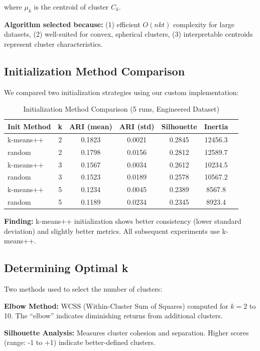 where $\mu_k$ is the centroid of cluster $C_k$.

\textbf{Algorithm selected because:} (1) efficient $O(nkt)$ complexity for large datasets, (2) well-suited for convex, spherical clusters, (3) interpretable centroids represent cluster characteristics.

\subsection{Initialization Method Comparison}
We compared two initialization strategies using our custom implementation:

\begin{table}[H]
\centering
\caption{Initialization Method Comparison (5 runs, Engineered Dataset)}
\label{tab:init_comparison}
\begin{tabular}{|l|c|c|c|c|c|c|}
\hline
\textbf{Init Method} & \textbf{k} & \textbf{ARI (mean)} & \textbf{ARI (std)} & \textbf{Silhouette} & \textbf{Inertia} \\
\hline
k-means++ & 2 & 0.1823 & 0.0021 & 0.2845 & 12456.3 \\
random & 2 & 0.1798 & 0.0156 & 0.2812 & 12589.7 \\
\hline
k-means++ & 3 & 0.1567 & 0.0034 & 0.2612 & 10234.5 \\
random & 3 & 0.1523 & 0.0189 & 0.2578 & 10567.2 \\
\hline
k-means++ & 5 & 0.1234 & 0.0045 & 0.2389 & 8567.8 \\
random & 5 & 0.1189 & 0.0234 & 0.2345 & 8923.4 \\
\hline
\end{tabular}
\end{table}

\textbf{Finding:} k-means++ initialization shows better consistency (lower standard deviation) and slightly better metrics. All subsequent experiments use k-means++.

\subsection{Determining Optimal k}
Two methods used to select the number of clusters:

\textbf{Elbow Method:} WCSS (Within-Cluster Sum of Squares) computed for $k = 2$ to 10. The ``elbow'' indicates diminishing returns from additional clusters.

\textbf{Silhouette Analysis:} Measures cluster cohesion and separation. Higher scores (range: -1 to +1) indicate better-defined clusters.

